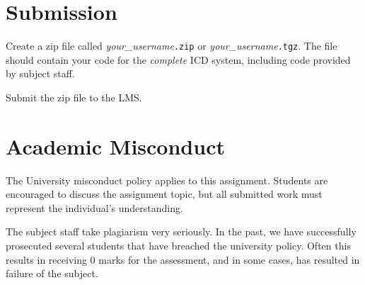 \documentclass[11pt]{article}
\begin{document}
\section{Submission}

Create a zip file called  \emph{your\_username}\texttt{.zip} or \emph{your\_username}\texttt{.tgz}. The file should contain your code for the \emph{complete} ICD system, including code provided by subject staff.

Submit the zip file to the LMS.

\section{Academic Misconduct}

The University misconduct policy applies to this assignment. Students are encouraged to discuss the assignment topic, but all submitted work must represent the individual's understanding.

The subject staff take plagiarism very seriously. In the past, we have successfully prosecuted several students that have breached the university policy. Often this results in receiving 0 marks for the assessment, and in some cases, has resulted in failure of the subject.

\pagebreak

\appendix


\end{document}
